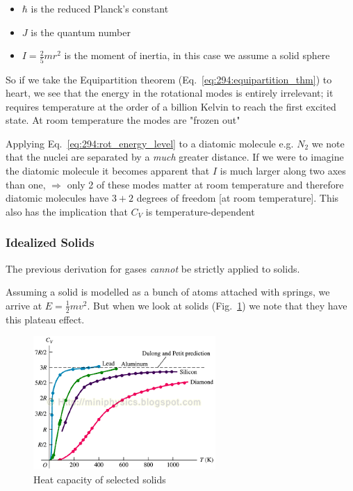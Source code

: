 \documentclass[10pt]{article}
\begin{document}
\begin{itemize}
	\item $ \hbar $  is the reduced Planck's constant
	\item $ J $  is the quantum number
	\item $ I = \frac{2}{5} mr^2 $ is the moment of inertia, in this case we assume a solid sphere
\end{itemize}

So if we take the Equipartition theorem (Eq.~\ref{eq:294:equipartition_thm}) to heart, we see that the energy in the rotational modes is entirely irrelevant; it requires temperature at the order of a billion Kelvin to reach the first excited state. 
At room temperature the modes are "frozen out"


Applying Eq.~\ref{eq:294:rot_energy_level} to a diatomic molecule e.g. $ N_2 $ we note that the nuclei are separated by a \textit{much} greater distance. 
If we were to imagine the diatomic molecule it becomes apparent that $ I $  is much larger along two axes than one, $ \Rightarrow $ only 2 of these modes matter at room temperature and therefore diatomic molecules have $ 3+2 $ degrees of freedom [at room temperature].
This also has the implication that $ C_V $ is temperature-dependent


\subsubsection{Idealized Solids}

The previous derivation for gases \textit{cannot} be strictly applied to solids.



Assuming a solid is modelled as a bunch of atoms attached with springs, we arrive at $ E = \frac{1}{2}mv^2 $.
But when we look at solids (Fig.~\ref{fig:294:heat_capacity_selected_solids}) we note that they have this plateau effect.

\begin{figure}[htpb]
	\centering
	\includegraphics[width=0.8\linewidth]{img/heat_capacity.png}
	\caption{Heat capacity of selected solids}
	\label{fig:294:heat_capacity_selected_solids}
\end{figure}
\end{document}
